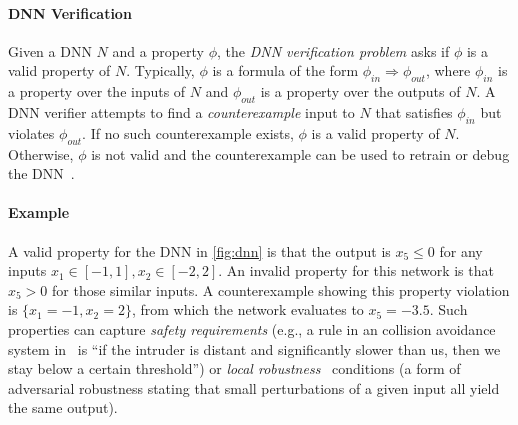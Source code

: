 \documentclass[oneside,11pt,dvipsnames]{book}
\begin{document}
\paragraph{DNN Verification} Given a DNN \(N\) and a property $\phi$, the \emph{DNN verification problem} asks if $\phi$ is a valid property of $N$.
Typically, $\phi$ is a formula of the form $\phi_{in} \Rightarrow \phi_{out}$, where $\phi_{in}$ is a property over the inputs of $N$ and $\phi_{out}$ is a property over the outputs of $N$.
A DNN verifier attempts to find a \emph{counterexample} input to $N$ that satisfies $\phi_{in}$ but violates $\phi_{out}$.  If no such counterexample exists, $\phi$ is a valid property of $N$. Otherwise, $\phi$ is not valid and the counterexample can be used to retrain or debug the DNN~\cite{huang2017safety}.









\paragraph{Example} A valid property for the DNN in \autoref{fig:dnn} is that the output is $x_5 \le 0$ for any inputs $x_1 \in [-1,1], x_2\in[-2,2]$. An invalid property for this network is that $x_5 > 0$ for those similar inputs.
A counterexample showing this property violation is $\{x_1=-1, x_2=2\}$, from which the network evaluates to $x_5=-3.5$. Such properties can capture \emph{safety requirements} (e.g., a rule in an  collision avoidance system in~\cite{kochenderfer2012next,katz2017reluplex} is ``if the intruder is distant and significantly slower than us, then we stay below a certain threshold'') or \emph{local robustness}~\cite{katz2017towards} conditions (a form of adversarial robustness stating that small perturbations of a given input all yield the same output).
\end{document}
